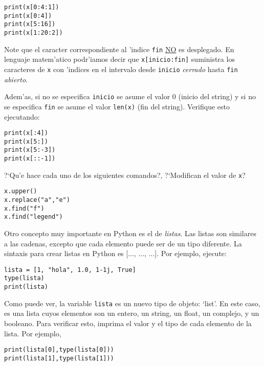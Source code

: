 \documentclass[11pt]{exam}
\begin{document}
\begin{questions}
\begin{verbatim}
print(x[0:4:1])
print(x[0:4])
print(x[5:16])
print(x[1:20:2])
\end{verbatim}

Note que el caracter correspondiente al 'indice \texttt{fin} \underline{NO} es desplegado. En lenguaje matem'atico podr'iamos decir que \texttt{x[inicio:fin]} suministra los caracteres de \texttt{x} con 'indices en el intervalo desde \texttt{inicio} \textit{cerrado} hasta \texttt{fin} \textit{abierto}.

\item Adem'as, si no se especifica \texttt{inicio} se asume el valor 0 (inicio del string) y si no se especifica \texttt{fin} se asume el valor \texttt{len(x)} (fin del string). Verifique esto ejecutando:

\begin{verbatim}
print(x[:4])
print(x[5:])
print(x[5:-3])
print(x[::-1])
\end{verbatim}

\item ?`Qu'e hace cada uno de los siguientes comandos?, ?`Modifican el valor de \texttt{x}?

\begin{verbatim}
x.upper()
x.replace("a","e")
x.find("f")
x.find("legend")
\end{verbatim}

\item Otro concepto muy importante en Python es el de \textit{listas}. Las listas son  similares a las cadenas, excepto que cada elemento puede ser de un tipo diferente. La sintaxis para crear listas en Python es [..., ..., ...]. Por ejemplo, ejecute:

\begin{verbatim}
lista = [1, "hola", 1.0, 1-1j, True]
type(lista)
print(lista)
\end{verbatim}

Como puede ver, la variable \texttt{lista} es un nuevo tipo de objeto: `list'. En este caso, es una lista cuyos elementos son un entero, un string, un float, un complejo, y un booleano. Para verificar esto, imprima el valor y el tipo de cada elemento de la lista. Por ejemplo,

\begin{verbatim}
print(lista[0],type(lista[0]))
print(lista[1],type(lista[1]))
\end{verbatim}


\end{questions}
\end{document}
